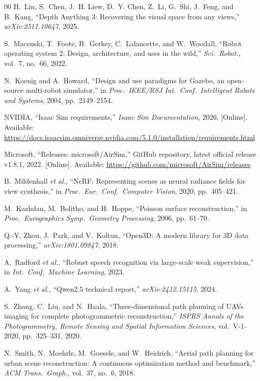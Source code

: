 \documentclass[conference]{IEEEtran}
\begin{document}
\begin{thebibliography}{00}
H.~Lin, S.~Chen, J.~H. Liew, D.~Y. Chen, Z.~Li, G.~Shi, J.~Feng,
and B.~Kang, ``Depth Anything 3: Recovering the visual space from
any views,'' \emph{arXiv:2511.10647}, 2025.

S.~Macenski, T.~Foote, B.~Gerkey, C.~Lalancette, and W.~Woodall,
``Robot operating system 2: Design, architecture, and uses in the
wild,'' \emph{Sci.\ Robot.}, vol.~7, no.~66, 2022.

N.~Koenig and A.~Howard, ``Design and use paradigms for Gazebo,
an open-source multi-robot simulator,'' in \emph{Proc.\ IEEE/RSJ
Int.\ Conf.\ Intelligent Robots and Systems}, 2004,
pp.~2149--2154.

NVIDIA, ``Isaac Sim requirements,'' \emph{Isaac Sim Documentation},
2026. [Online]. Available: \url{https://docs.isaacsim.omniverse.nvidia.com/5.1.0/installation/requirements.html}

Microsoft, ``Releases: microsoft/AirSim,'' GitHub repository, latest
official release v1.8.1, 2022. [Online]. Available:
\url{https://github.com/microsoft/AirSim/releases}

B.~Mildenhall \emph{et al.}, ``NeRF: Representing scenes as neural
radiance fields for view synthesis,'' in \emph{Proc.\ Eur.\ Conf.\
Computer Vision}, 2020, pp.~405--421.

M.~Kazhdan, M.~Bolitho, and H.~Hoppe, ``Poisson surface
reconstruction,'' in \emph{Proc.\ Eurographics Symp.\ Geometry
Processing}, 2006, pp.~61--70.

Q.-Y. Zhou, J.~Park, and V.~Koltun, ``Open3D: A modern library for
3D data processing,'' \emph{arXiv:1801.09847}, 2018.

A.~Radford \emph{et al.}, ``Robust speech recognition via large-scale
weak supervision,'' in \emph{Int.\ Conf.\ Machine Learning}, 2023.

A.~Yang \emph{et al.}, ``Qwen2.5 technical report,''
\emph{arXiv:2412.15115}, 2024.

S.~Zhang, C.~Liu, and N.~Haala, ``Three-dimensional path planning
of UAVs imaging for complete photogrammetric reconstruction,''
\emph{ISPRS Annals of the Photogrammetry, Remote Sensing and
Spatial Information Sciences}, vol.~V-1-2020, pp.~325--331, 2020.

N.~Smith, N.~Moehrle, M.~Goesele, and W.~Heidrich, ``Aerial path
planning for urban scene reconstruction: A continuous optimization
method and benchmark,'' \emph{ACM Trans.\ Graph.}, vol.~37, no.~6,
2018.


\end{thebibliography}
\end{document}
